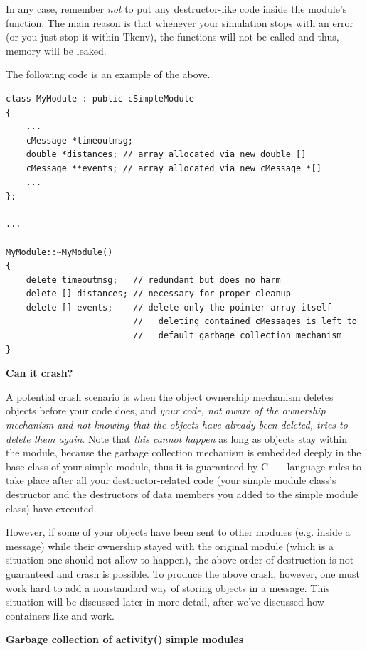 In any case, remember \textit{not} to put any destructor-like
code inside the module's  function. The main reason
is that whenever your simulation stops with an error (or
you just stop it within Tkenv), the  functions
will not be called and thus, memory will be leaked.

The following code is an example of the above.

\begin{verbatim}
class MyModule : public cSimpleModule
{
    ...
    cMessage *timeoutmsg;
    double *distances; // array allocated via new double []
    cMessage **events; // array allocated via new cMessage *[]
    ...
};

...

MyModule::~MyModule()
{
    delete timeoutmsg;   // redundant but does no harm
    delete [] distances; // necessary for proper cleanup
    delete [] events;    // delete only the pointer array itself --
                         //   deleting contained cMessages is left to
                         //   default garbage collection mechanism
}
\end{verbatim}

\textbf{Can it crash?}

A potential crash scenario is when the object ownership
mechanism deletes objects before your code does, and \textit{your code,
not aware of the ownership mechanism and not knowing that the objects
have already been deleted, tries to delete them again}.
Note that \textit{this cannot happen} as long as objects stay within the module,
because the garbage collection mechanism is embedded deeply
in the base class of your simple module, thus it is guaranteed
by C++ language rules to take place after
all your destructor-related code (your simple module class's destructor
and the destructors of data members you added to the simple module class)
have executed.

However, if some of your objects have been sent to other modules
(e.g. inside a message)
while their ownership stayed with the original module (which is a
situation one should not allow to happen), the above order of destruction
is not guaranteed and crash is possible. To produce the above crash, however,
one must work hard to add a nonstandard way of storing objects in a message.
This situation will be discussed later in more detail, after we've discussed
how containers like  and  work.

\textbf{Garbage collection of activity() simple modules}

